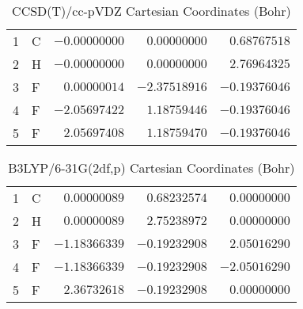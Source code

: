 \documentclass[10pt,oneside]{article}
\begin{document}
\begin{table}[h!]
\centering
\caption{CCSD(T)/cc-pVDZ Cartesian Coordinates (Bohr)}
\begin{tabular}{llrrr}
1  & C  & $-0.00000000$ & $ 0.00000000$ & $ 0.68767518$ \\
2  & H  & $-0.00000000$ & $ 0.00000000$ & $ 2.76964325$ \\
3  & F  & $ 0.00000014$ & $-2.37518916$ & $-0.19376046$ \\
4  & F  & $-2.05697422$ & $ 1.18759446$ & $-0.19376046$ \\
5  & F  & $ 2.05697408$ & $ 1.18759470$ & $-0.19376046$ \\
\end{tabular}
\end{table}

\begin{table}[h!]
\centering
\caption{B3LYP/6-31G(2df,p) Cartesian Coordinates (Bohr)}
\begin{tabular}{llrrr}
1  & C  & $ 0.00000089$ & $ 0.68232574$ & $ 0.00000000$ \\
2  & H  & $ 0.00000089$ & $ 2.75238972$ & $ 0.00000000$ \\
3  & F  & $-1.18366339$ & $-0.19232908$ & $ 2.05016290$ \\
4  & F  & $-1.18366339$ & $-0.19232908$ & $-2.05016290$ \\
5  & F  & $ 2.36732618$ & $-0.19232908$ & $ 0.00000000$ \\
\end{tabular}
\end{table}

\clearpage
\end{document}
